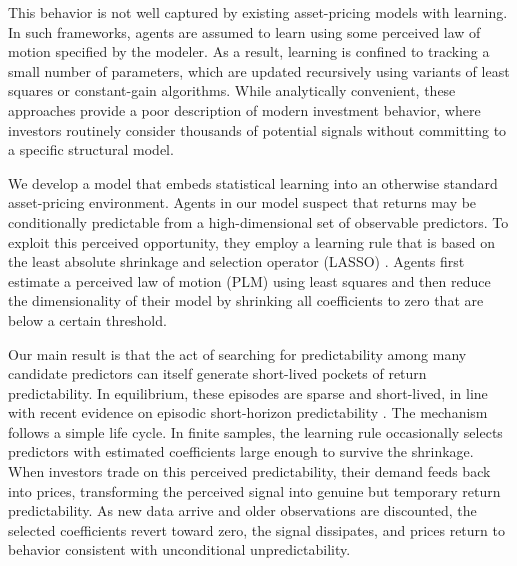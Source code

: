 \documentclass[11pt]{article}
\begin{document}
This behavior is not well captured by existing asset-pricing models with learning. 
In such frameworks, agents are assumed to learn using some perceived law of motion specified by the modeler.
As a result, learning is confined to tracking a small number of parameters, which are updated recursively using variants of least squares or constant-gain algorithms. 
While analytically convenient, these approaches provide a poor description of modern investment behavior, where investors routinely consider thousands of potential signals without committing to a specific structural model.

We develop a model that embeds statistical learning into an otherwise standard asset-pricing environment. 
Agents in our model suspect that returns may be conditionally predictable from a high-dimensional set of observable predictors. 
To exploit this perceived opportunity, they employ a learning rule that is based on the least absolute shrinkage and selection operator (LASSO) \citep{Tibshirani1996}.
Agents first estimate a perceived law of motion (PLM) using least squares and then reduce the dimensionality of their model by shrinking all coefficients to zero that are below a certain threshold.

Our main result is that the act of searching for predictability among many candidate predictors can itself generate short-lived pockets of return predictability. 
In equilibrium, these episodes are sparse and short-lived, in line with recent evidence on episodic short-horizon predictability \citep{Chinco2019, Farmer2023}. 
The mechanism follows a simple life cycle. 
In finite samples, the learning rule occasionally selects predictors with estimated coefficients large enough to survive the shrinkage.
When investors trade on this perceived predictability, their demand feeds back into prices, transforming the perceived signal into genuine but temporary return predictability. 
As new data arrive and older observations are discounted, the selected coefficients revert toward zero, the signal dissipates, and prices return to behavior consistent with unconditional unpredictability.
\end{document}

